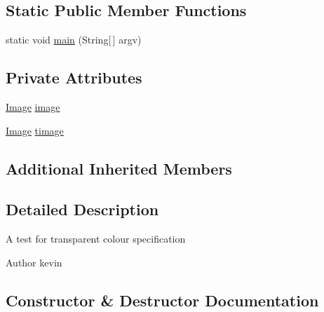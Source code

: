 \subsection*{Static Public Member Functions}
\begin{DoxyCompactItemize}
\item 
static void \mbox{\hyperlink{classorg_1_1newdawn_1_1slick_1_1tests_1_1_transparent_color_test_a7283800feb1ab083044f7a9829b95eeb}{main}} (String\mbox{[}$\,$\mbox{]} argv)
\end{DoxyCompactItemize}
\subsection*{Private Attributes}
\begin{DoxyCompactItemize}
\item 
\mbox{\hyperlink{classorg_1_1newdawn_1_1slick_1_1_image}{Image}} \mbox{\hyperlink{classorg_1_1newdawn_1_1slick_1_1tests_1_1_transparent_color_test_a4604f1b98ff0397381e1a18b3f50ec9d}{image}}
\item 
\mbox{\hyperlink{classorg_1_1newdawn_1_1slick_1_1_image}{Image}} \mbox{\hyperlink{classorg_1_1newdawn_1_1slick_1_1tests_1_1_transparent_color_test_ac3344321755a8261d1a2eb28fb5816e0}{timage}}
\end{DoxyCompactItemize}
\subsection*{Additional Inherited Members}


\subsection{Detailed Description}
A test for transparent colour specification

\begin{DoxyAuthor}{Author}
kevin 
\end{DoxyAuthor}


\subsection{Constructor \& Destructor Documentation}
\mbox{\label{classorg_1_1newdawn_1_1slick_1_1tests_1_1_transparent_color_test_a88d3d3735b2f55daa13b5be1fd29c125}} 
